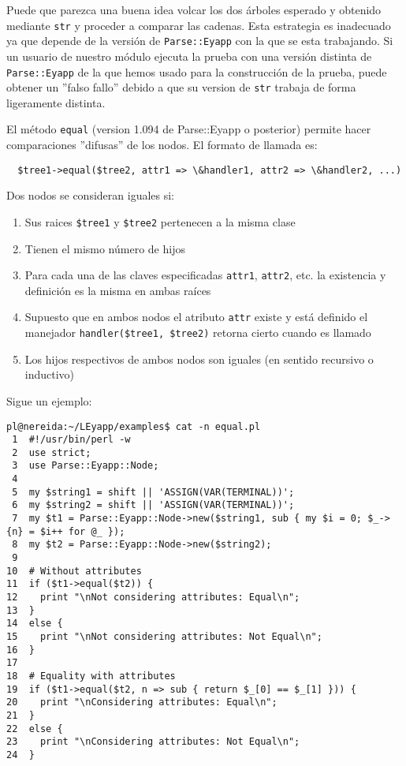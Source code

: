 
Puede que parezca una buena idea volcar los dos árboles esperado y obtenido mediante \verb|str|
y proceder a comparar las cadenas. Esta estrategia es inadecuado ya que depende 
de la versión de \verb|Parse::Eyapp| con la que se esta trabajando. Si un usuario de
nuestro módulo ejecuta la prueba con una versión distinta de \verb|Parse::Eyapp|
de la que hemos usado para la construcción de la prueba, puede obtener un ''falso fallo''
debido a que su version de \verb|str| trabaja de forma ligeramente distinta.


El método \verb|equal| (version 1.094 de Parse::Eyapp o posterior) permite
hacer comparaciones ''difusas'' de los nodos.
El formato de llamada es:

\begin{verbatim}
  $tree1->equal($tree2, attr1 => \&handler1, attr2 => \&handler2, ...)
\end{verbatim}

Dos nodos se consideran iguales si:

\begin{enumerate}
\item
Sus raices \verb|$tree1| y \verb|$tree2| pertenecen a la misma clase
\item
Tienen el mismo número de hijos
\item
Para cada una de las claves especificadas \verb|attr1|, \verb|attr2|, etc. la existencia
y definición es la misma en ambas raíces
\item
Supuesto que en ambos nodos el atributo \verb|attr| existe y está definido
el manejador \verb|handler($tree1, $tree2)| retorna cierto cuando es llamado
\item
Los hijos respectivos de ambos nodos son iguales (en sentido recursivo o inductivo) 
\end{enumerate}

Sigue un ejemplo:

\begin{verbatim}
pl@nereida:~/LEyapp/examples$ cat -n equal.pl
 1  #!/usr/bin/perl -w
 2  use strict;
 3  use Parse::Eyapp::Node;
 4
 5  my $string1 = shift || 'ASSIGN(VAR(TERMINAL))';
 6  my $string2 = shift || 'ASSIGN(VAR(TERMINAL))';
 7  my $t1 = Parse::Eyapp::Node->new($string1, sub { my $i = 0; $_->{n} = $i++ for @_ });
 8  my $t2 = Parse::Eyapp::Node->new($string2);
 9
10  # Without attributes
11  if ($t1->equal($t2)) {
12    print "\nNot considering attributes: Equal\n";
13  }
14  else {
15    print "\nNot considering attributes: Not Equal\n";
16  }
17
18  # Equality with attributes
19  if ($t1->equal($t2, n => sub { return $_[0] == $_[1] })) {
20    print "\nConsidering attributes: Equal\n";
21  }
22  else {
23    print "\nConsidering attributes: Not Equal\n";
24  }
\end{verbatim}

